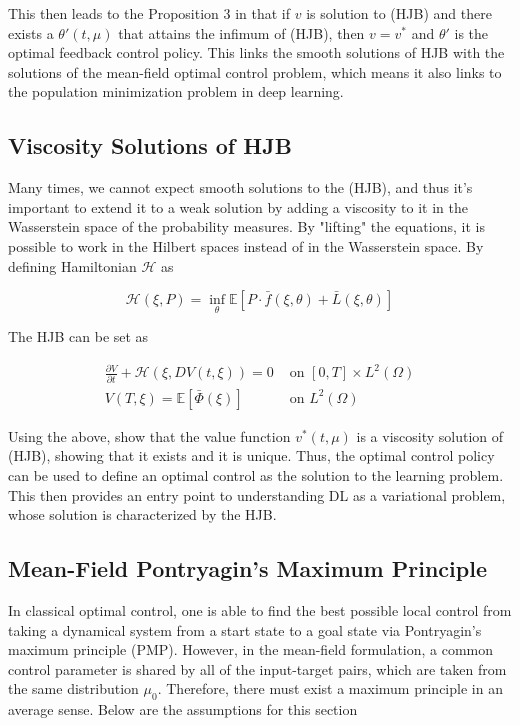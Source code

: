 This then leads to the Proposition 3 in \cite{meanfield} that if $v$ is solution to (HJB) and there exists a $\theta'(t,\mu)$ that attains the infimum of (HJB), then $v=v^*$ and $\theta'$ is the optimal feedback control policy. This links the smooth solutions of HJB with the solutions of the mean-field optimal control problem, which means it also links to the population minimization problem in deep learning.

\subsection{Viscosity Solutions of HJB}
Many times, we cannot expect smooth solutions to the (HJB), and thus it's important to extend it to a weak solution by adding a viscosity to it in the Wasserstein space of the probability measures. By "lifting" the equations, it is possible to work in the Hilbert spaces instead of in the Wasserstein space. By defining Hamiltonian $\mathcal{H}$ as

\begin{equation*}
    \mathcal{H}(\xi, P) = \inf_\theta \mathbb{E} [P \cdot \bar{f}(\xi,\theta) + \bar{L}(\xi,\theta)]
\end{equation*}

The HJB can be set as

\begin{align*}
    \frac{\partial V}{\partial t} + \mathcal{H}(\xi,DV(t,\xi)) = 0 & \text{ on } [0,T] \times L^2(\Omega) \\
    V(T,\xi) = \mathbb{E}[\bar{\Phi}(\xi)] & \text{ on } L^2(\Omega)
\end{align*}

Using the above, \cite{meanfield} show that the value function $v^*(t,\mu)$ is a viscosity solution of (HJB), showing that it exists and it is unique. Thus, the optimal control policy can be used to define an optimal control as the solution to the learning problem. This then provides an entry point to understanding DL as a variational problem, whose solution is characterized by the HJB.

\subsection{Mean-Field Pontryagin's Maximum Principle}
In classical optimal control, one is able to find the best possible local control from taking a dynamical system from a start state to a goal state via Pontryagin's maximum principle (PMP). However, in the mean-field formulation, a common control parameter is shared by all of the input-target pairs, which are taken from the same distribution $\mu_0$. Therefore, there must exist a maximum principle in an average sense. Below are the assumptions for this section

